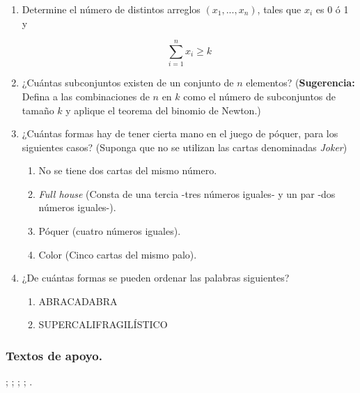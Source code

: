 \begin{enumerate}
\item Determine el número de distintos arreglos $(x_1, . . . , x_n)$, tales que $x_i$ es 0 ó 1 y

\[
\sum_{i=1}^{n} x_i \ge k 
\]

\item ¿Cuántas subconjuntos existen de un conjunto de $n$ elementos? (\textbf{Sugerencia:} Defina a las combinaciones de $n$ en $k$ como el número de subconjuntos de tamaño $k$ y aplique el teorema del binomio de Newton.)

\item ¿Cuántas formas hay de tener cierta mano en el juego de póquer, para los siguientes casos? (Suponga que no se utilizan las cartas denominadas \textit{Joker})
\begin{enumerate}
	\item No se tiene dos cartas del mismo número.
	\item \textit{Full house} (Consta de una tercia -tres números iguales- y un par -dos números iguales-).
	\item Póquer (cuatro números iguales).
	\item Color (Cinco cartas del mismo palo).
\end{enumerate}

\item ¿De cuántas formas se pueden ordenar las palabras siguientes?
\begin{enumerate}
	\item ABRACADABRA
	\item SUPERCALIFRAGILÍSTICO
\end{enumerate}

\end{enumerate}

\subsubsection*{Textos de apoyo.} 
; ; ; ; .
